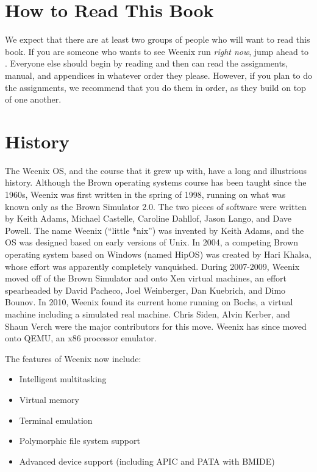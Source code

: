 \section{How to Read This Book}
We expect that there are at least two groups of people who will want to read this book. If you are someone who wants to see Weenix run \emph{right now}, jump ahead to . Everyone else should begin by reading  and then can read the assignments, manual, and appendices in whatever order they please. However, if you plan to do the assignments, we recommend that you do them in order, as they build on top of one another.

\section{History}
The Weenix OS, and the course that it grew up with, have a long and illustrious history. Although the Brown operating systems course has been taught since the 1960s, Weenix was first written in the spring of 1998, running on what was known only as the Brown Simulator 2.0. The two pieces of software were written by Keith Adams, Michael Castelle, Caroline Dahllof, Jason Lango, and Dave Powell. The name Weenix (``little *nix'') was invented by Keith Adams, and the OS was designed based on early versions of Unix. In 2004, a competing Brown operating system based on Windows (named HipOS) was created by Hari Khalsa, whose effort was apparently completely vanquished. During 2007-2009, Weenix moved off of the Brown Simulator and onto Xen virtual machines, an effort spearheaded by David Pacheco, Joel Weinberger, Dan Kuebrich, and Dimo Bounov. In 2010, Weenix found its current home running on Bochs, a virtual machine including a simulated real machine. Chris Siden, Alvin Kerber, and Shaun Verch were the major contributors for this move. Weenix has since moved onto QEMU, an x86 processor emulator.

The features of Weenix now include:
\begin{itemize}
    \item Intelligent multitasking
    \item Virtual memory
    \item Terminal emulation
    \item Polymorphic file system support
    \item Advanced device support (including APIC and PATA with BMIDE)
\end{itemize}

